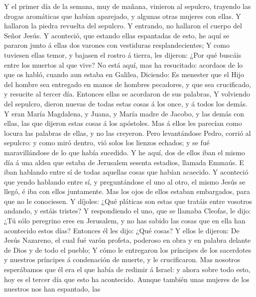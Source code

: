  Y el primer día de la semana, muy de mañana, vinieron al
sepulcro, trayendo las drogas aromáticas que habían aparejado, y algunas
otras mujeres con ellas.  Y hallaron la piedra revuelta del
sepulcro.  Y entrando, no hallaron el cuerpo del Señor
Jesús.  Y aconteció, que estando ellas espantadas de esto,
he aquí se pararon junto á ellas dos varones con vestiduras
resplandecientes;  Y como tuviesen ellas temor, y bajasen el
rostro á tierra, les dijeron: ¿Por qué buscáis entre los muertos al que
vive?  No está aquí, mas ha resucitado: acordaos de lo que
os habló, cuando aun estaba en Galilea,  Diciendo: Es
menester que el Hijo del hombre sea entregado en manos de hombres
pecadores, y que sea crucificado, y resucite al tercer día. 
Entonces ellas se acordaron de sus palabras,  Y volviendo
del sepulcro, dieron nuevas de todas estas cosas á los once, y á todos
los demás.  Y eran María Magdalena, y Juana, y María madre
de Jacobo, y las demás con ellas, las que dijeron estas cosas á los
apóstoles.  Mas á ellos les parecían como locura las
palabras de ellas, y no las creyeron.  Pero levantándose
Pedro, corrió al sepulcro: y como miró dentro, vió solos los lienzos
echados; y se fué maravillándose de lo que había sucedido. 
Y he aquí, dos de ellos iban el mismo día á una aldea que estaba de
Jerusalem sesenta estadios, llamada Emmaús.  E iban
hablando entre sí de todas aquellas cosas que habían acaecido.
 Y aconteció que yendo hablando entre sí, y preguntándose
el uno al otro, el mismo Jesús se llegó, é iba con ellos juntamente.
 Mas los ojos de ellos estaban embargados, para que no le
conociesen.  Y díjoles: ¿Qué pláticas son estas que tratáis
entre vosotros andando, y estáis tristes?  Y respondiendo
el uno, que se llamaba Cleofas, le dijo: ¿Tú sólo peregrino eres en
Jerusalem, y no has sabido las cosas que en ella han acontecido estos
días?  Entonces él les dijo: ¿Qué cosas? Y ellos le
dijeron: De Jesús Nazareno, el cual fué varón profeta, poderoso en obra
y en palabra delante de Dios y de todo el pueblo;  Y cómo
le entregaron los príncipes de los sacerdotes y nuestros príncipes á
condenación de muerte, y le crucificaron.  Mas nosotros
esperábamos que él era el que había de redimir á Israel: y ahora sobre
todo esto, hoy es el tercer día que esto ha acontecido. 
Aunque también unas mujeres de los nuestros nos han espantado, las
